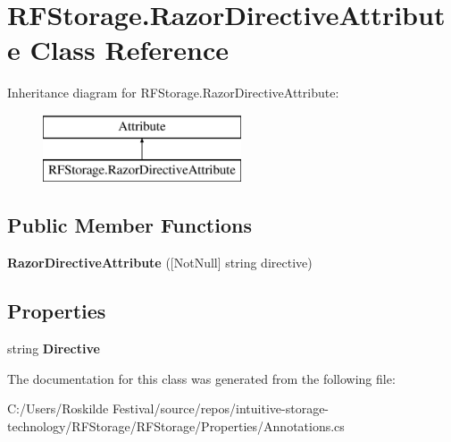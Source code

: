 \hypertarget{class_r_f_storage_1_1_razor_directive_attribute}{}\section{R\+F\+Storage.\+Razor\+Directive\+Attribute Class Reference}
\label{class_r_f_storage_1_1_razor_directive_attribute}
Inheritance diagram for R\+F\+Storage.\+Razor\+Directive\+Attribute\+:\begin{figure}[H]
\begin{center}
\leavevmode
\includegraphics[height=2.000000cm]{class_r_f_storage_1_1_razor_directive_attribute}
\end{center}
\end{figure}
\subsection*{Public Member Functions}
\begin{DoxyCompactItemize}
\item 
\mbox{\label{class_r_f_storage_1_1_razor_directive_attribute_af06d18c4514c3634f8cacabc45dd4595}} 
{\bfseries Razor\+Directive\+Attribute} (\mbox{[}Not\+Null\mbox{]} string directive)
\end{DoxyCompactItemize}
\subsection*{Properties}
\begin{DoxyCompactItemize}
\item 
\mbox{\label{class_r_f_storage_1_1_razor_directive_attribute_ae27add7a9fc769a50c4f913c0e80a96b}} 
string {\bfseries Directive}
\end{DoxyCompactItemize}


The documentation for this class was generated from the following file\+:\begin{DoxyCompactItemize}
\item 
C\+:/\+Users/\+Roskilde Festival/source/repos/intuitive-\/storage-\/technology/\+R\+F\+Storage/\+R\+F\+Storage/\+Properties/Annotations.\+cs\end{DoxyCompactItemize}
